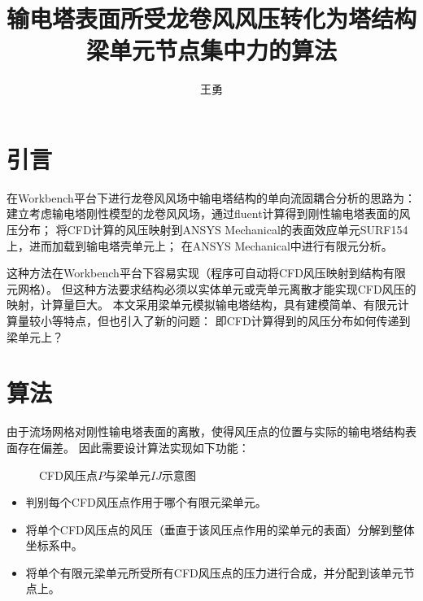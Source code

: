 \documentclass{ctexart}
\title{输电塔表面所受龙卷风风压转化为塔结构梁单元节点集中力的算法}
\author{王勇}
\date{}
\begin{document}
\graphicspath{{figures/}}

\maketitle


\section{引言}
在Workbench平台下进行龙卷风风场中输电塔结构的单向流固耦合分析的思路为：
建立考虑输电塔刚性模型的龙卷风风场，通过fluent计算得到刚性输电塔表面的风压分布；
将CFD计算的风压映射到ANSYS Mechanical的表面效应单元SURF154上，进而加载到输电塔壳单元上；
在ANSYS Mechanical中进行有限元分析。

这种方法在Workbench平台下容易实现（程序可自动将CFD风压映射到结构有限元网格）。
但这种方法要求结构必须以实体单元或壳单元离散才能实现CFD风压的映射，计算量巨大。
本文采用梁单元模拟输电塔结构，具有建模简单、有限元计算量较小等特点，但也引入了新的问题：
即CFD计算得到的风压分布如何传递到梁单元上？

\section{算法}
由于流场网格对刚性输电塔表面的离散，使得风压点的位置与实际的输电塔结构表面存在偏差。
因此需要设计算法实现如下功能：

\begin{figure}[!htbp]
    \centering
    
    \caption{CFD风压点$P$与梁单元$IJ$示意图}
    \label{fig:algo}
\end{figure}

\begin{itemize}
	\item 判别每个CFD风压点作用于哪个有限元梁单元。
	\item 将单个CFD风压点的风压（垂直于该风压点作用的梁单元的表面）分解到整体坐标系中。
	\item 将单个有限元梁单元所受所有CFD风压点的压力进行合成，并分配到该单元节点上。
\end{itemize}
\end{document}
